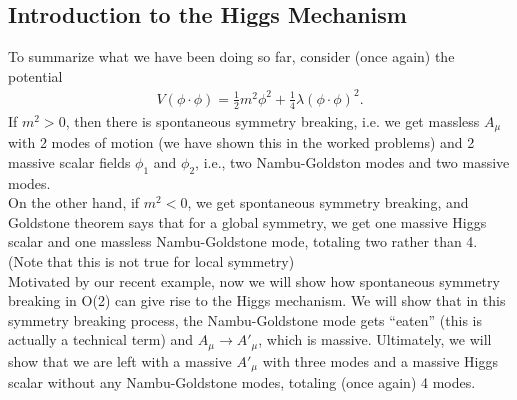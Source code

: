 \documentclass[a4paper,11pt]{article}
\numberwithin{equation}{section}
\theoremstyle{definition}
\begin{document}
\subsection{Introduction to the Higgs Mechanism}
To summarize what we have been doing so far, consider (once again) the potential
\begin{align}
V(\phi\cdot\phi) = \frac{1}{2}m^2\phi^2 + \frac{1}{4}\lambda(\phi\cdot\phi)^2.
\end{align}
If $m^2 > 0$, then there is spontaneous symmetry breaking, i.e. we get massless $A_\mu$ with 2 modes of motion (we have shown this in the worked problems) and 2 massive scalar fields $\phi_1$ and $\phi_2$, i.e., two Nambu-Goldston modes and two massive modes.\\

On the other hand, if $m^2 < 0$, we get spontaneous symmetry breaking, and Goldstone theorem says that for a global symmetry, we get one massive Higgs scalar and one massless Nambu-Goldstone mode, totaling two rather than 4. (Note that this is not true for local symmetry)\\

Motivated by our recent example, now we will show how spontaneous symmetry breaking in O(2) can give rise to the Higgs mechanism. We will show that in this symmetry breaking process, the Nambu-Goldstone mode gets ``eaten'' (this is actually a technical term) and $A_\mu \to A'_\mu$, which is massive. Ultimately, we will show that we are left with a massive $A'_\mu$ with three modes and a massive Higgs scalar without any Nambu-Goldstone modes, totaling (once again) 4 modes.  \\
\end{document}

